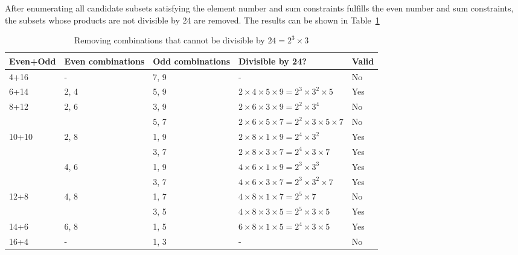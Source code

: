 \documentclass[11pt,a4paper]{article}
\begin{document}
After enumerating all candidate subsets satisfying the element number and sum constraints fulfills the even  number and sum constraints, the subsets whose products are not divisible by 24 are removed. The results can be shown in Table~\ref{tab:sums-filter}

\begin{table}[h]
\centering
\caption{Removing combinations that cannot be divisible by $24 = 2^3 \times 3$}
\label{tab:sums-filter}
\begin{tabular}{lllll}
\toprule
Even+Odd & Even combinations & Odd combinations & Divisible by 24? & Valid \\
\midrule
4+16  & -        & 7, 9          & - & No \\

6+14  & 2, 4     & 5, 9          &
$2\times4\times5\times9 = 2^3 \times 3^2 \times 5$
& Yes \\

8+12  & 2, 6     & 3, 9          &
$2\times6\times3\times9 = 2^2 \times 3^4$
& No \\

      &          & 5, 7          &
$2\times6\times5\times7 = 2^2 \times 3 \times 5 \times 7$
& No \\

10+10 & 2, 8     & 1, 9          &
$2\times8\times1\times9 = 2^4 \times 3^2$
& Yes \\

      &          & 3, 7          &
$2\times8\times3\times7 = 2^4 \times 3 \times 7$
& Yes \\

      & 4, 6     & 1, 9          &
$4\times6\times1\times9 = 2^3 \times 3^3$
& Yes \\

      &          & 3, 7          &
$4\times6\times3\times7 = 2^3 \times 3^2 \times 7$
& Yes \\

12+8  & 4, 8     & 1, 7          &
$4\times8\times1\times7 = 2^5 \times 7$
& No \\

      &          & 3, 5          &
$4\times8\times3\times5 = 2^5 \times 3 \times 5$
& Yes \\

14+6  & 6, 8     & 1, 5          &
$6\times8\times1\times5 = 2^4 \times 3 \times 5$
& Yes \\

16+4  & -        & 1, 3          & - & No \\
\bottomrule
\end{tabular}
\end{table}
\end{document}
